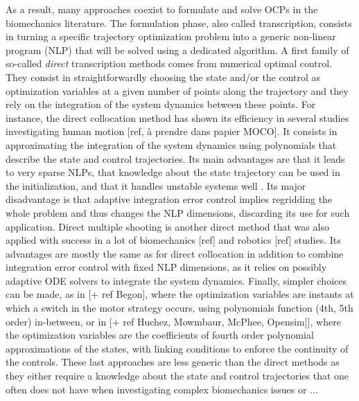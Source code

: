 As a result, many approaches coexist to formulate and solve OCPs in the biomechanics literature. 
The formulation phase, also called transcription, consists in turning a specific trajectory optimization problem into a generic non-linear program (NLP) that will be
solved using a dedicated algorithm. 
A first family of so-called \textit{direct} transcription methods comes from numerical optimal control. 
They consist in straightforwardly choosing the state and/or the control as optimization variables at a given number of points along the trajectory and they rely on the integration of the system dynamics between these points. 
For instance, the direct collocation method has shown its efficiency in several studies investigating human motion [ref, à prendre dans papier MOCO]. 
It consists in approximating the integration of the system dynamics using polynomials that describe the state and control trajectories.
Its main advantages are that it leads to very sparse NLPs, that knowledge about the state trajectory can be used in the initialization, and that it handles unstable systems well \cite{diehl2006fast}. 
Its major disadvantage is that adaptive integration error control implies regridding the whole problem and thus changes the NLP dimensions, discarding its use for such application.
Direct multiple shooting is another direct method that was also applied with success in a lot of biomechanics [ref] and robotics [ref] studies.
Its advantages are mostly the same as for direct collocation in addition to combine integration error control with fixed NLP dimensions, as it relies on possibly adaptive ODE solvers to integrate the system dynamics.
Finally, simpler choices can be made, as in \cite{yeadon2000mechanics} [+ ref Begon], where the optimization variables are instants at which a switch in the motor strategy occurs, using polynomials function (4th, 5th order) in-between, or in \cite{leboeuf2006energetic} [+ ref  Huchez, Mowmbaur, McPhee, Opensim]], where the optimization variables are the coefficients of fourth order polynomial approximations of the states, with linking conditions to enforce the continuity of the controls. 
These last approaches are less generic than the direct methods as they either require a knowledge about the state and control trajectories that one often does not have when investigating complex biomechanics issues or ... 


